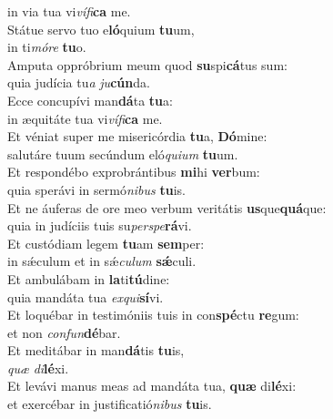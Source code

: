 \oddverse in via tua vi\textit{ví}\textit{fi}\textbf{ca} me.\\
\evenverse Státue servo tuo e\textbf{ló}quium \textbf{tu}um,~\*\\
\evenverse in ti\textit{mó}\textit{re} \textbf{tu}o.\\
\oddverse Amputa oppróbrium meum quod \textbf{su}spi\textbf{cá}tus sum:~\*\\
\oddverse quia judícia tu\textit{a} \textit{ju}\textbf{cún}da.\\
\evenverse Ecce concupívi man\textbf{dá}ta \textbf{tu}a:~\*\\
\evenverse in æquitáte tua vi\textit{ví}\textit{fi}\textbf{ca} me.\\
\oddverse Et véniat super me misericórdia \textbf{tu}a, \textbf{Dó}mine:~\*\\
\oddverse salutáre tuum secúndum eló\textit{qui}\textit{um} \textbf{tu}um.\\
\evenverse Et respondébo exprobrántibus \textbf{mi}hi \textbf{ver}bum:~\*\\
\evenverse quia sperávi in sermó\textit{ni}\textit{bus} \textbf{tu}is.\\
\oddverse Et ne áuferas de ore meo verbum veritátis \textbf{us}que\textbf{quá}que:~\*\\
\oddverse quia in judíciis tuis su\textit{per}\textit{spe}\textbf{rá}vi.\\
\evenverse Et custódiam legem \textbf{tu}am \textbf{sem}per:~\*\\
\evenverse in sǽculum et in sǽ\textit{cu}\textit{lum} \textbf{sǽ}culi.\\
\oddverse Et ambulábam in \textbf{la}ti\textbf{tú}dine:~\*\\
\oddverse quia mandáta tua \textit{ex}\textit{qui}\textbf{sí}vi.\\
\evenverse Et loquébar in testimóniis tuis in con\textbf{spé}ctu \textbf{re}gum:~\*\\
\evenverse et non \textit{con}\textit{fun}\textbf{dé}bar.\\
\oddverse Et meditábar in man\textbf{dá}tis \textbf{tu}is,~\*\\
\oddverse \textit{quæ} \textit{di}\textbf{lé}xi.\\
\evenverse Et levávi manus meas ad mandáta tua, \textbf{quæ} di\textbf{lé}xi:~\*\\
\evenverse et exercébar in justificatió\textit{ni}\textit{bus} \textbf{tu}is.\\
